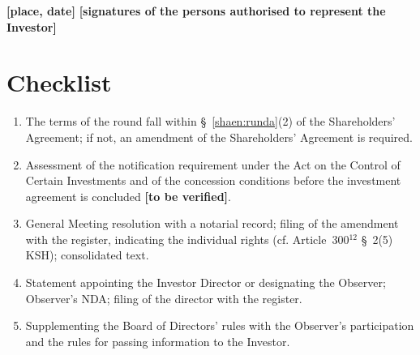 \documentclass[11pt,a4paper]{report}
\newcommand{\field}[1]{\textbf{[#1]}}
\newcommand{\UA}[1]{\S~#1 of the Shareholders' Agreement}
\begin{document}
\field{place, date} \hfill \field{signatures of the persons authorised to represent the Investor}

\section*{Checklist}

\begin{enumerate}
  \item The terms of the round fall within \UA{\ref{shaen:runda}(2)}; if not, an amendment of the Shareholders' Agreement is required.
  \item Assessment of the notification requirement under the Act on the Control of Certain Investments and of the concession conditions before the investment agreement is concluded \field{to be verified}.
  \item General Meeting resolution with a notarial record; filing of the amendment with the register, indicating the individual rights (cf. Article~300$^{12}$ \S~2(5) KSH); consolidated text.
  \item Statement appointing the Investor Director or designating the Observer; Observer's NDA; filing of the director with the register.
  \item Supplementing the Board of Directors' rules with the Observer's participation and the rules for passing information to the Investor.
\end{enumerate}
\end{document}
